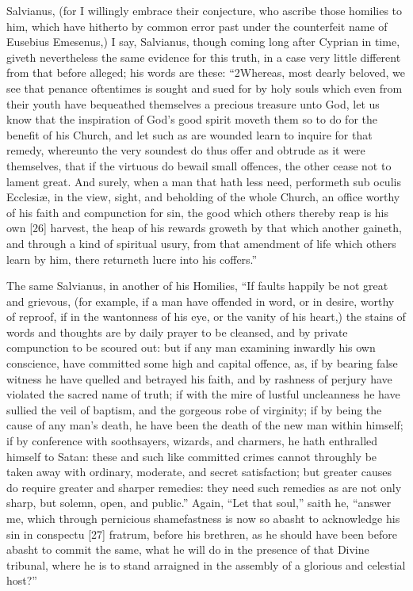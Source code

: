 Salvianus, (for I willingly embrace their conjecture, who ascribe those homilies to him, which have hitherto by common error past under the counterfeit name of Eusebius Emesenus,) I say, Salvianus, though coming long after Cyprian in time, giveth nevertheless the same evidence for this truth, in a case very little different from that before alleged; his words are these: “2Whereas, most dearly beloved, we see that penance oftentimes is sought and sued for by holy souls which even from their youth have bequeathed themselves a precious treasure unto God, let us know that the inspiration of God’s good spirit moveth them so to do for the benefit of his Church, and let such as are wounded learn to inquire for that remedy, whereunto the very soundest do thus offer and obtrude as it were themselves, that if the virtuous do bewail small offences, the other cease not to lament great. And surely, when a man that hath less need, performeth sub oculis Ecclesiæ, in the view, sight, and beholding of the whole Church, an office worthy of his faith and compunction for sin, the good which others thereby reap is his own [26] harvest, the heap of his rewards groweth by that which another gaineth, and through a kind of spiritual usury, from that amendment of life which others learn by him, there returneth lucre into his coffers.”

The same Salvianus, in another of his Homilies, “If faults happily be not great and grievous, (for example, if a man have offended in word, or in desire, worthy of reproof, if in the wantonness of his eye, or the vanity of his heart,) the stains of words and thoughts are by daily prayer to be cleansed, and by private compunction to be scoured out: but if any man examining inwardly his own conscience, have committed some high and capital offence, as, if by bearing false witness he have quelled and betrayed his faith, and by rashness of perjury have violated the sacred name of truth; if with the mire of lustful uncleanness he have sullied the veil of baptism, and the gorgeous robe of virginity; if by being the cause of any man’s death, he have been the death of the new man within himself; if by conference with soothsayers, wizards, and charmers, he hath enthralled himself to Satan: these and such like committed crimes cannot throughly be taken away with ordinary, moderate, and secret satisfaction; but greater causes do require greater and sharper remedies: they need such remedies as are not only sharp, but solemn, open, and public.” Again, “Let that soul,” saith he, “answer me, which through pernicious shamefastness is now so abasht to acknowledge his sin in conspectu [27] fratrum, before his brethren, as he should have been before abasht to commit the same, what he will do in the presence of that Divine tribunal, where he is to stand arraigned in the assembly of a glorious and celestial host?”

